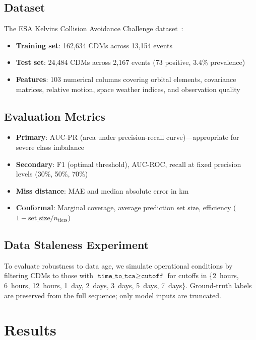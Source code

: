 \documentclass{article}
\begin{document}
\subsection{Dataset}
\label{sec:dataset}

The ESA Kelvins Collision Avoidance Challenge dataset~\citep{uriot2021}:
\begin{itemize}
\item \textbf{Training set}: 162,634 CDMs across 13,154 events
\item \textbf{Test set}: 24,484 CDMs across 2,167 events (73 positive, 3.4\% prevalence)
\item \textbf{Features}: 103 numerical columns covering orbital elements, covariance matrices, relative motion, space weather indices, and observation quality
\end{itemize}

\subsection{Evaluation Metrics}
\label{sec:metrics}

\begin{itemize}
\item \textbf{Primary}: AUC-PR (area under precision-recall curve)---appropriate for severe class imbalance
\item \textbf{Secondary}: F1 (optimal threshold), AUC-ROC, recall at fixed precision levels (30\%, 50\%, 70\%)
\item \textbf{Miss distance}: MAE and median absolute error in km
\item \textbf{Conformal}: Marginal coverage, average prediction set size, efficiency ($1 - \text{set\_size}/n_{\text{tiers}}$)
\end{itemize}

\subsection{Data Staleness Experiment}
\label{sec:staleness-exp}

To evaluate robustness to data age, we simulate operational conditions by filtering CDMs to those with $\texttt{time\_to\_tca} \geq \texttt{cutoff}$ for cutoffs in \{2~hours, 6~hours, 12~hours, 1~day, 2~days, 3~days, 5~days, 7~days\}. Ground-truth labels are preserved from the full sequence; only model inputs are truncated.

\section{Results}
\label{sec:results}
\end{document}
